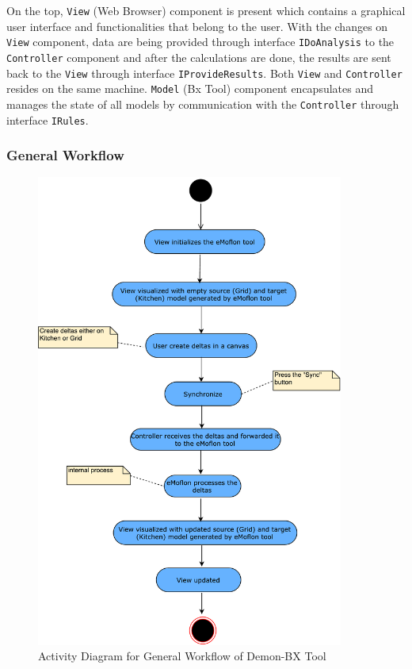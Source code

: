 On the top, \texttt{View} (Web Browser) component is present which contains a graphical user interface and functionalities that belong to the user. With the changes on \texttt{View} component, data are being provided through interface \texttt{IDoAnalysis} to the \texttt{Controller} component and after the calculations are done, the results are sent back to the \texttt{View} through interface \texttt{IProvideResults}. Both \texttt{View} and \texttt{Controller} resides on the same machine. \texttt{Model} (Bx Tool) component encapsulates and manages the state of all models by communication with the \texttt{Controller} through interface \texttt{IRules}.

\subsubsection{General Workflow}\label{subsubsec:generalworkflow}

\begin{figure}
	\includegraphics[width=0.9\textwidth]{figures/Activity_Diagram}
	\caption{Activity Diagram for General Workflow of Demon-BX Tool}
	\label{fig:Activity_Diagram}
\end{figure}

